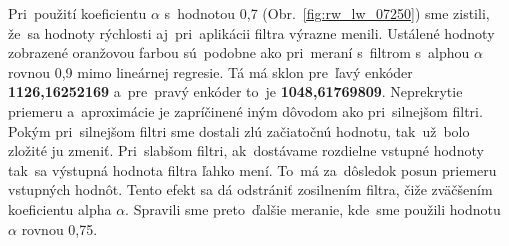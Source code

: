 Pri~použití koeficientu $\alpha$ s~hodnotou 0,7 (Obr.~\ref{fig:rw_lw_07250}) sme zistili, že~sa hodnoty rýchlosti aj~pri~aplikácii
filtra výrazne menili. Ustálené hodnoty zobrazené oranžovou farbou sú~podobne ako pri~meraní s~filtrom s~alphou $\alpha$
rovnou 0,9 mimo lineárnej regresie. Tá má sklon pre~ľavý enkóder \textbf{1126,16252169} a~pre~pravý enkóder to~je
\textbf{1048,61769809}. Neprekrytie priemeru a~aproximácie je zapríčinené iným dôvodom ako pri~silnejšom filtri. Pokým
pri~silnejšom filtri sme dostali zlú začiatočnú hodnotu, tak~už~bolo zložité ju zmeniť. Pri~slabšom filtri, ak~dostávame
rozdielne vstupné hodnoty tak~sa výstupná hodnota filtra ľahko mení. To~má za~dôsledok posun priemeru vstupných hodnôt.
Tento efekt sa dá odstrániť zosilnením filtra, čiže zväčšením koeficientu alpha $\alpha$. Spravili sme preto~ďalšie meranie,
kde~sme použili hodnotu $\alpha$ rovnou 0,75.

